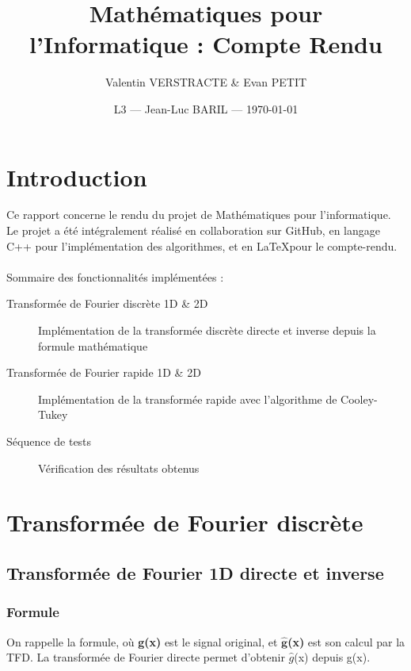\documentclass{article}
\title{Mathématiques pour l'Informatique : Compte Rendu} %
\author{Valentin VERSTRACTE \& Evan PETIT}
\date{L3 --- Jean-Luc BARIL --- \today} %
\begin{document}
\maketitle %

\bigskip
\bigskip
\renewcommand{\contentsname}{Table des matières}
\tableofcontents
\vspace{75pt}

% 
\newpage
\section{Introduction} 

Ce rapport concerne le rendu du projet de Mathématiques pour l'informatique. Le projet a été intégralement réalisé en collaboration sur GitHub, en langage C++ pour l'implémentation des algorithmes, et en \LaTeX pour le compte-rendu.\\~\\
Sommaire des fonctionnalités implémentées :


\begin{description}
	\item [Transformée de Fourier discrète 1D \& 2D] Implémentation de la transformée discrète directe et inverse depuis la formule mathématique 
	\item [Transformée de Fourier rapide 1D \& 2D] Implémentation de la transformée rapide avec l'algorithme de Cooley-Tukey
	\item [Séquence de tests] Vérification des résultats obtenus 
\end{description}
\newpage
\section{Transformée de Fourier discrète}



\subsection{Transformée de Fourier 1D directe et inverse}

\subsubsection{Formule}
On rappelle la formule, où \textbf{g(x)} est le signal original, et \textbf{$\widehat{\textbf{g}}$(x)} est son calcul par la TFD. La transformée de Fourier directe permet d'obtenir $\widehat{g}$(x) depuis g(x).
\end{document}
